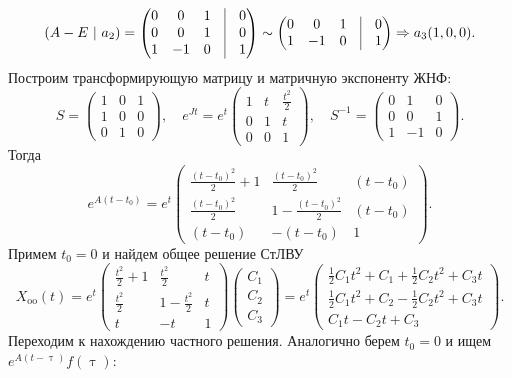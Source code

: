 \documentclass[a4paper, 12pt]{article}
\begin{document}
$$(A-E\ |\ a_2) = \begin{pmatrix}
	0 & 0 & 1 & \vline & 0\\
	0 & 0 & 1 & \vline & 0\\
	1 & -1 & 0 & \vline & 1
\end{pmatrix}\sim \begin{pmatrix}
	0 & 0 & 1  & \vline & 0\\
	1 & -1 & 0  & \vline & 1
\end{pmatrix}\Rightarrow a_3(1,0,0).$$
Построим трансформирующую матрицу и матричную экспоненту ЖНФ:
$$S = \begin{pmatrix}
	1 & 0 & 1\\
	1 & 0 & 0\\
	0 & 1 & 0
\end{pmatrix},\quad e^{Jt} = e^t\begin{pmatrix}
1 & t & \frac{t^2}{2}\\
0 & 1 & t\\
0 & 0 & 1
\end{pmatrix},\quad S^{-1} = \begin{pmatrix}
0 & 1 & 0\\
0 & 0 & 1\\
1 & -1 & 0
\end{pmatrix}.$$
Тогда $$e^{A(t-t_0)} = e^t\begin{pmatrix}
	\frac{(t-t_0)^2}{2} + 1 & \frac{(t-t_0)^2}{2} & (t-t_0)\\
	\frac{(t-t_0)^2}{2} & 1 - \frac{(t-t_0)^2}{2} & (t-t_0)\\
	(t-t_0) & -(t-t_0) & 1
\end{pmatrix}.$$
Примем $t_0 = 0$ и найдем общее решение СтЛВУ
$$X_{\text{oo}}(t) = e^t\begin{pmatrix}
	\frac{t^2}{2} + 1 & \frac{t^2}{2} &t\\
	\frac{t^2}{2} & 1 - \frac{t^2}{2} & t\\
	t & -t & 1
\end{pmatrix}\begin{pmatrix}
C_1\\C_2\\C_3
\end{pmatrix} = e^t\begin{pmatrix}
\frac{1}{2}C_1t^2 + C_1 + \frac{1}{2}C_2t^2 + C_3t\\
\frac{1}{2}C_1t^2 + C_2 - \frac{1}{2}C_2t^2 + C_3t\\
C_1t - C_2t + C_3
\end{pmatrix}.$$
Переходим к нахождению частного решения. Аналогично берем $t_0 =0$ и ищем $e^{A(t-\uptau)}f(\uptau)$:
\end{document}
